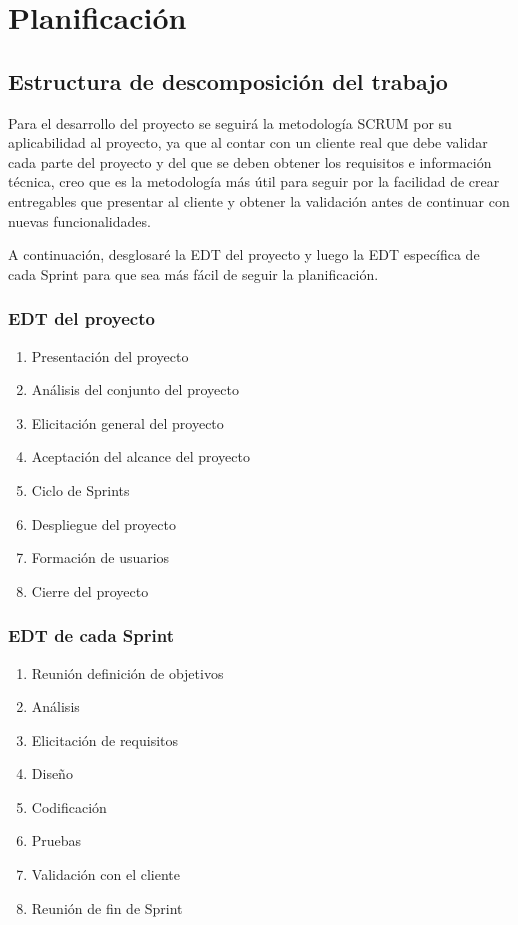 \chapter{Planificación}\label{cap:planificación}

\section{Estructura de descomposición del trabajo}

Para el desarrollo del proyecto se seguirá la metodología SCRUM por su aplicabilidad al proyecto, ya que al contar con un cliente real que debe validar cada parte del proyecto y del que se deben obtener los requisitos e información técnica, creo que es la metodología más útil para seguir por la facilidad de crear entregables que presentar al cliente y obtener la validación antes de continuar con nuevas funcionalidades.

A continuación, desglosaré la EDT del proyecto y luego la EDT específica de cada Sprint para que sea más fácil de seguir la planificación.

\subsection{EDT del proyecto}\label{cap:Planificación}

\begin{enumerate}
    \item Presentación del proyecto
    \item Análisis del conjunto del proyecto
    \item Elicitación general del proyecto
    \item Aceptación del alcance del proyecto
    \item Ciclo de Sprints
    \item Despliegue del proyecto
    \item Formación de usuarios
    \item Cierre del proyecto
\end{enumerate}

\subsection{EDT de cada Sprint}

\begin{enumerate}
    \item Reunión definición de objetivos
    \item Análisis
    \item Elicitación de requisitos
    \item Diseño
    \item Codificación
    \item Pruebas
    \item Validación con el cliente
    \item Reunión de fin de Sprint
\end{enumerate}

